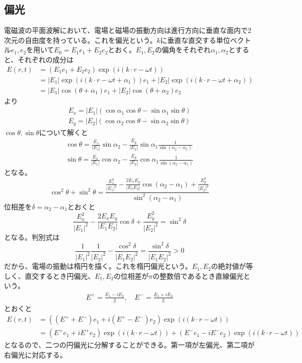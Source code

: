 \subsection{偏光}
    電磁波の平面波解において、電場と磁場の振動方向は進行方向に垂直な面内で2次元の自由度を持っている。これを偏光という。$k$に垂直な直交する単位ベクトル$e_1, e_2$を用いて$E_0 = E_1e_1 + E_2e_2$とおく。$E_1, E_2$の偏角をそれぞれ$\alpha_1, \alpha_2$とすると、それぞれの成分は
    \begin{align*}
        E(r, t)
        &= (E_1e_1 + E_2e_2)\exp(i(k \cdot r - \omega t))\\
        &= |E_1|\exp(i(k \cdot r - \omega t + \alpha_1))e_1 + |E_2|\exp(i(k \cdot r - \omega t + \alpha_2))\\
        &= |E_1|\cos(\theta + \alpha_1)e_1 + |E_2|\cos(\theta + \alpha_2)e_2
    \end{align*}
    より
    \begin{align*}
        E_x = |E_1|(\cos\alpha_1\cos\theta - \sin\alpha_1\sin\theta)\\
        E_y = |E_2|(\cos\alpha_2\cos\theta - \sin\alpha_2\sin\theta)
    \end{align*}
    $\cos\theta, \sin\theta$について解くと
    \begin{align*}
        \cos\theta = \frac{E_x}{|E_1|}\sin\alpha_2 - \frac{E_y}{|E_2|}\sin\alpha_1\frac{1}{\sin(\alpha_2 - \alpha_1)}\\
        \sin\theta = \frac{E_x}{|E_1|}\cos\alpha_2 - \frac{E_y}{|E_2|}\cos\alpha_1\frac{1}{\sin(\alpha_2 - \alpha_1)}
    \end{align*}
    となる。
        \[\cos^2\theta + \sin^2\theta = \frac{\frac{E_x^2}{|E_1|^2} - \frac{2E_xE_y}{|E_1E_2|}\cos(\alpha_2 - \alpha_1) + \frac{E_y^2}{|E_2|^2}}{\sin^2(\alpha_2 - \alpha_1)}\]
    位相差を$\delta = \alpha_2 - \alpha_1$とおくと
        \[\frac{E_x^2}{|E_1|^2} - \frac{2E_xE_y}{|E_1E_2|}\cos\delta + \frac{E_y^2}{|E_2|^2} = \sin^2\delta\]
    となる。判別式は
        \[\frac{1}{|E_1|^2}\frac{1}{|E_2|^2} - \frac{\cos^2\delta}{|E_1E_2|^2} = \frac{\sin^2\delta}{|E_1E_2|^2} > 0\]
    だから、電場の振動は楕円を描く。これを楕円偏光という。$E_1, E_2$の絶対値が等しく、直交するとき円偏光、$E_1, E_2$の位相差が$\pi$の整数倍であるとき直線偏光という。
    \begin{align*}
        E^+ = \frac{E_1 - iE_2}{2}, \quad E^- = \frac{E_1 + iE_2}{2}
    \end{align*}
    とおくと
    \begin{align*}
        E(r, t)
        &= ((E^+ + E^-)e_1 + i(E^+ - E^-)e_2)\exp(i(k \cdot r - \omega t))\\
        &= (E^+e_1 + iE^+e_2)\exp(i(k \cdot r - \omega t)) + (E^-e_1 - iE^-e_2)\exp(i(k \cdot r - \omega t))
    \end{align*}
    となるので、二つの円偏光に分解することができる。第一項が左偏光、第二項が右偏光に対応する。

